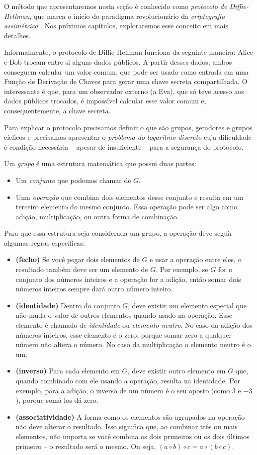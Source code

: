 O método que apresentaremos nesta seção é conhecido como {\em protocolo de Diffie-Hellman}, que marca o início do paradigma revolucionário da {\em criptografia assimétrica} \cite{Diffie76}.
Nos próximos capítulos, exploraremos esse conceito em mais detalhes.

Informalmente, o protocolo de Diffie-Hellman funciona da seguinte maneira:
Alice e Bob trocam entre si alguns dados públicos.
A partir desses dados, ambos conseguem calcular um valor comum, que pode ser usado como entrada em uma Função de Derivação de Chaves para gerar uma chave secreta compartilhada.
O interessante é que, para um observador externo (a Eva), que só teve acesso aos dados públicos trocados, é impossível calcular esse valor comum e, consequentemente, a chave secreta.

Para explicar o protocolo precisamos definir o que são grupos, geradores e grupos cíclicos e precisamos apresentar o {\em problema do logaritmo discreto} cuja dificuldade é condição necessária -- apesar de insuficiente -- para a segurança do protocolo.

Um {\em grupo} é uma estrutura matemática que possui duas partes:
\begin{itemize}
\item Um {\em conjunto} que podemos chamar de $G$.
\item Uma {\em operação} que combina dois elementos desse conjunto e resulta em um terceiro elemento do mesmo conjunto.
  Essa operação pode ser algo como adição, multiplicação, ou outra forma de combinação.
  \end{itemize}

Para que essa estrutura seja considerada um grupo, a operação deve seguir algumas regras específicas:
\begin{itemize}
\item[] {\bf (fecho)} Se você pegar dois elementos de $G$ e usar a operação entre eles, o resultado também deve ser um elemento de $G$.
  Por exemplo, se $G$ for o conjunto dos números inteiros e a operação for a adição, então somar dois números inteiros sempre dará outro número inteiro.
\item[] {\bf (identidade)} Dentro do conjunto $G$, deve existir um elemento especial que não muda o valor de outros elementos quando usado na operação.
  Esse elemento é chamado de {\em identidade} ou {\em elemento neutro}.
  No caso da adição dos números inteiros, esse elemento é o zero, porque somar zero a qualquer número não altera o número.
  No caso da multiplicação o elemento neutro é o um.
\item[] {\bf (inverso)} Para cada elemento em $G$, deve existir outro elemento em $G$ que, quando combinado com ele usando a operação, resulta na identidade.
  Por exemplo, para a adição, o inverso de um número é o seu oposto (como $3$ e $-3$), porque somá-los dá zero.
\item[] {\bf (associatividade)} A forma como os elementos são agrupados na operação não deve alterar o resultado. Isso significa que, ao combinar três ou mais elementos, não importa se você combina os dois primeiros ou os dois últimos primeiro – o resultado será o mesmo.
  Ou seja, $(a \circ b) \circ c = a \circ (b \circ c)$.
\end{itemize}

